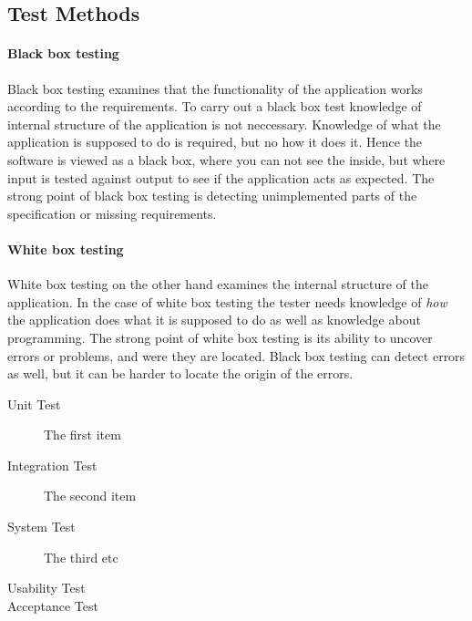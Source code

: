\subsection{Test Methods}

\paragraph{Black box testing}

Black box testing examines that the functionality of the application works according to the requirements. To carry out a black box test knowledge of internal structure of the application is not neccessary. Knowledge of what the application is supposed to do is required, but no how it does it. Hence the software is viewed as a black box, where you can not see the inside, but where input is tested against output to see if the application acts as expected. The strong point of black box testing is detecting unimplemented parts of the specification or missing requirements.

\paragraph{White box testing}

White box testing on the other hand examines the internal structure of the application. In the case of white box testing the tester needs knowledge of \emph{how} the application does what it is supposed to do as well as knowledge about programming. The strong point of white box testing is its ability to uncover errors or problems, and were they are located. Black box testing can detect errors as well, but it can be harder to locate the origin of the errors.

\begin{description}
  \item[Unit Test] The first item
  \item[Integration Test] The second item
  \item[System Test] The third etc
  \item[Usability Test]
  \item[Acceptance Test]
\end{description}